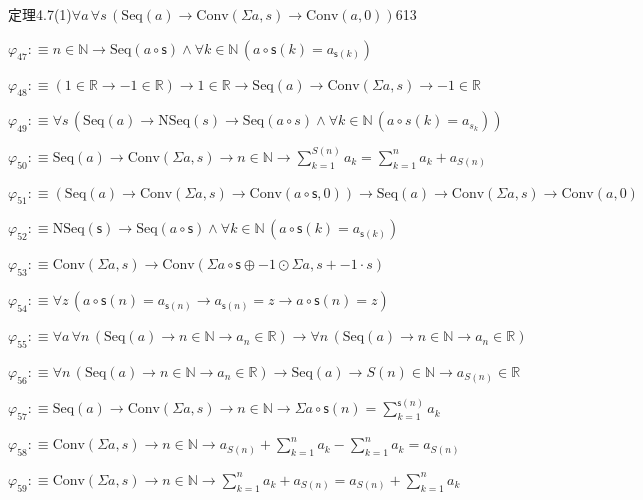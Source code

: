 \begin{fullproof}{定理4.7(1)}{$\forall a\,\forall s\,(\mathrm{Seq}(a) \to \mathrm{Conv}(\Sigma a,s) \to \mathrm{Conv}(a,0))$}{613}
\begin{abbrevlist}
\item $\varphi_{47} :\equiv n \in \mathbb{N} \to \mathrm{Seq}(a \circ \mathsf{s}) \land \forall k \in \mathbb{N}\,(a \circ \mathsf{s}(k) = a_{\mathsf{s}(k)})$
\item $\varphi_{48} :\equiv (1 \in \mathbb{R} \to -1 \in \mathbb{R}) \to 1 \in \mathbb{R} \to \mathrm{Seq}(a) \to \mathrm{Conv}(\Sigma a,s) \to -1 \in \mathbb{R}$
\item $\varphi_{49} :\equiv \forall s\,(\mathrm{Seq}(a) \to \mathrm{NSeq}(s) \to \mathrm{Seq}(a \circ s) \land \forall k \in \mathbb{N}\,(a \circ s(k) = a_{s_{k}}))$
\item $\varphi_{50} :\equiv \mathrm{Seq}(a) \to \mathrm{Conv}(\Sigma a,s) \to n \in \mathbb{N} \to {\textstyle\sum_{k=1}^{S(n)} a_{k}} = {\textstyle\sum_{k=1}^{n} a_{k}} + a_{S(n)}$
\item $\varphi_{51} :\equiv (\mathrm{Seq}(a) \to \mathrm{Conv}(\Sigma a,s) \to \mathrm{Conv}(a \circ \mathsf{s},0)) \to \mathrm{Seq}(a) \to \mathrm{Conv}(\Sigma a,s) \to \mathrm{Conv}(a,0)$
\item $\varphi_{52} :\equiv \mathrm{NSeq}(\mathsf{s}) \to \mathrm{Seq}(a \circ \mathsf{s}) \land \forall k \in \mathbb{N}\,(a \circ \mathsf{s}(k) = a_{\mathsf{s}(k)})$
\item $\varphi_{53} :\equiv \mathrm{Conv}(\Sigma a,s) \to \mathrm{Conv}(\Sigma a \circ \mathsf{s} \oplus -1 \odot \Sigma a,s + -1 \cdot s)$
\item $\varphi_{54} :\equiv \forall z\,(a \circ \mathsf{s}(n) = a_{\mathsf{s}(n)} \to a_{\mathsf{s}(n)} = z \to a \circ \mathsf{s}(n) = z)$
\item $\varphi_{55} :\equiv \forall a\,\forall n\,(\mathrm{Seq}(a) \to n \in \mathbb{N} \to a_{n} \in \mathbb{R}) \to \forall n\,(\mathrm{Seq}(a) \to n \in \mathbb{N} \to a_{n} \in \mathbb{R})$
\item $\varphi_{56} :\equiv \forall n\,(\mathrm{Seq}(a) \to n \in \mathbb{N} \to a_{n} \in \mathbb{R}) \to \mathrm{Seq}(a) \to S(n) \in \mathbb{N} \to a_{S(n)} \in \mathbb{R}$
\item $\varphi_{57} :\equiv \mathrm{Seq}(a) \to \mathrm{Conv}(\Sigma a,s) \to n \in \mathbb{N} \to \Sigma a \circ \mathsf{s}(n) = {\textstyle\sum_{k=1}^{\mathsf{s}(n)} a_{k}}$
\item $\varphi_{58} :\equiv \mathrm{Conv}(\Sigma a,s) \to n \in \mathbb{N} \to a_{S(n)} + {\textstyle\sum_{k=1}^{n} a_{k}} - {\textstyle\sum_{k=1}^{n} a_{k}} = a_{S(n)}$
\item $\varphi_{59} :\equiv \mathrm{Conv}(\Sigma a,s) \to n \in \mathbb{N} \to {\textstyle\sum_{k=1}^{n} a_{k}} + a_{S(n)} = a_{S(n)} + {\textstyle\sum_{k=1}^{n} a_{k}}$

\end{abbrevlist}
\end{fullproof}
